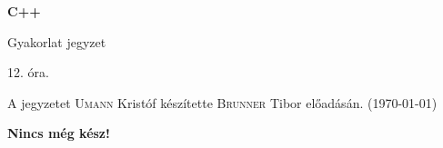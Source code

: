 \documentclass[a4paper,11.5pt]{article}
\begin{document}
	\setlength\parindent{0pt}
	\def\s{\hspace{0.2mm}\vphantom{\beta}}
	\def\Z{\mathbb{Z}}
	\def\Q{\mathbb{Q}}
	\def\R{\mathbb{R}}
	\def\C{\mathbb{C}}
	\def\N{\mathbb{N}}
	\def\Ra{\overline{\mathbb{R}}}
	
	\def\sume{\displaystyle\sum_{n=1}^{+\infty}}
	\def\sumn{\displaystyle\sum_{n=0}^{+\infty}}
	
	\def\narrow{\underset{n\rightarrow+\infty}{\longrightarrow}}
	\def\limn{\displaystyle\lim_{n\to +\infty}}
	\def\limx{\displaystyle\lim_{x\to +\infty}}
	
	\theoremstyle{definition}
	\newtheorem{theorem}{Tétel}[subsection] 
	
	\theoremstyle{definition}
	\newtheorem{definition}[theorem]{Definíció} 
	\newtheorem{example}[theorem]{Példa} 
	\newtheorem{task}[theorem]{Feladat} 
	\newtheorem{note}[theorem]{Megjegyzés}
	\begin{center}
		{\LARGE\textbf{C++}}
		
		{\Large Gyakorlat jegyzet}
		
		12. óra.
	\end{center}
	A jegyzetet \textsc{Umann} Kristóf készítette \textsc{Brunner} Tibor  előadásán. (\today)
	\medskip
	
	
	{\LARGE \textbf{Nincs még kész!}}
\end{document}

